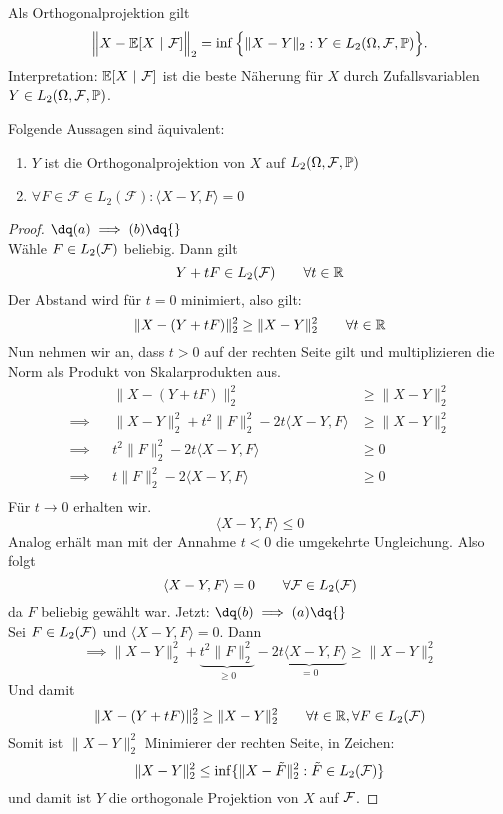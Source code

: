 \begin{bemerkung}
	Als Orthogonalprojektion gilt
	\begin{align*}
		\Big\Vert X-\E[X~|~\mathcal{F}]\Big\Vert_2=\inf\Big\lbrace\Vert X-Y\Vert_2:Y\in L_2(\Omega,\mathcal{F},\P)\Big\rbrace.
	\end{align*}
	Interpretation: $\E[X~|~\mathcal{F}]$ ist die beste Näherung für $X$ durch Zufallsvariablen\\ $Y\in L_2(\Omega,\mathcal{F},\P)$.
\end{bemerkung}

\begin{proposition}\label{Prop1.3}
	Folgende Aussagen sind äquivalent:
	\renewcommand{\labelenumi}{(\alph{enumi})}
	\begin{enumerate}
		\item $Y$ ist die Orthogonalprojektion von $X$ auf $L_2(\Omega,\mathcal{F},\P)$ 
		\item $\forall F\in\mathcal{F}\in L_2(\mathcal{F}):\langle X-Y,F\rangle=0$
	\end{enumerate}
\end{proposition}

\begin{proof}
	$\dq (a) \implies (b) \dq{}$ \\
	Wähle $F \in L_2(\F)$ beliebig. Dann gilt
	\[Y + tF \in L_2(\F) \qquad \forall t \in \R\]
	Der Abstand wird für $t=0$ minimiert, also gilt:
	\[\|X-(Y+tF)\|_2^2 \geq \|X-Y\|_2^2 \qquad \forall t \in \R\]
	Nun nehmen wir an, dass $t>0$ auf der rechten Seite gilt und multiplizieren die Norm als Produkt von Skalarprodukten aus.
	\begin{align*}
		&&\|X-(Y+tF)\|_2^2 &\geq \|X-Y\|_2^2 \\
		\implies	&&\|X-Y\|_2^2 + t^2\|F\|_2^2 - 2t\langle X-Y, F \rangle &\geq \|X-Y\|_2^2 \\
		\implies	&&t^2\|F\|_2^2 - 2t\langle X-Y, F \rangle &\geq 0 \\
		\implies	&&t\|F\|_2^2 - 2\langle X-Y, F \rangle &\geq 0 \\
	\end{align*}
	Für $t\rightarrow0$ erhalten wir.
		\[\langle X-Y, F \rangle \leq 0\]
	Analog erhält man mit der Annahme $t<0$ die umgekehrte Ungleichung.
	Also folgt
	\[\langle X-Y, F \rangle = 0 \qquad \forall \F \in L_2(\F)\]
	da $F$ beliebig gewählt war.\nl
	Jetzt: $\dq (b) \implies (a) \dq{}$\\
	Sei $F\in L_2(\F)$ und $\langle X-Y, F \rangle = 0$. Dann
	\[\implies \|X-Y\|_2^2 + \underbrace{t^2\|F\|_2^2}_{\geq 0} - \underbrace{2t\langle X-Y, F \rangle}_{=0} \geq \|X-Y\|_2^2\]
	Und damit 
	\[\|X-(Y+tF)\|_2^2 \geq \|X-Y\|_2^2 \qquad \forall t\in\R, \forall F\in L_2(\F)\]
	Somit ist $\|X-Y\|_2^2$ Minimierer der rechten Seite, in Zeichen:
	\[\|X-Y\|_2^2 \leq \inf\{\|X-\tilde{F}\|_2^2 : \tilde{F}\in L_2(\F)\}\]
	und damit ist $Y$ die orthogonale Projektion von $X$ auf $\F$.
\end{proof}

